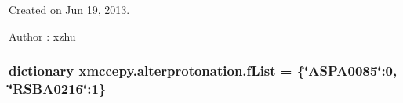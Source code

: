 Created on Jun 19, 2013. 

\begin{DoxyAuthor}{Author}
\-: xzhu 
\end{DoxyAuthor}
\hypertarget{namespacexmccepy_1_1alterprotonation_a21ca0b90681fab21533d9825b4e18a8b}{
\subsubsection[{f\-List}]{\setlength{\rightskip}{0pt plus 5cm}dictionary xmccepy.\-alterprotonation.\-f\-List = \{\char`\"{}A\-S\-P\-A0085\char`\"{}\-:0, \char`\"{}R\-S\-B\-A0216\char`\"{}\-:1\}}}\label{namespacexmccepy_1_1alterprotonation_a21ca0b90681fab21533d9825b4e18a8b}
